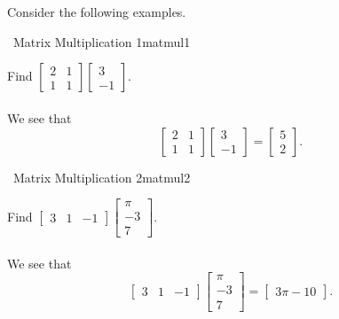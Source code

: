         \vphantom
        \\
        \\
        Consider the following examples.
        \begin{example}{\Difficulty\,\Difficulty\,\,Matrix Multiplication 1}{matmul1}
        
            Find \(\begin{bmatrix} 2 & 1 \\ 1 & 1 \end{bmatrix}\begin{bmatrix} 3 \\ -1 \end{bmatrix}\).
            \\
            \\
            We see that
            \begin{equation*}
                \begin{bmatrix} 2 & 1 \\ 1 & 1 \end{bmatrix}\begin{bmatrix} 3 \\ -1 \end{bmatrix}=\begin{bmatrix} 5 \\ 2 \end{bmatrix}.
            \end{equation*}
                
        \end{example}
        \begin{example}{\Difficulty\,\Difficulty\,\,Matrix Multiplication 2}{matmul2}
        
            Find \(\begin{bmatrix} 3 & 1 & -1 \end{bmatrix}\begin{bmatrix} \pi \\ -3 \\ 7 \end{bmatrix}\).
            \\
            \\
            We see that
            \begin{equation*}
               \begin{bmatrix} 3 & 1 & -1 \end{bmatrix}\begin{bmatrix} \pi \\ -3 \\ 7 \end{bmatrix}=\begin{bmatrix} 3\pi-10 \end{bmatrix}.
            \end{equation*}
                
        \end{example}
